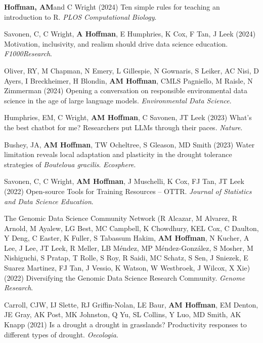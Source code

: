 \documentclass{cv}
\begin{document}
\begin{pubenum}
\item\textbf{Hoffman, AM}\footnotemark[1] and C Wright (2024) Ten simple rules for teaching an introduction to R. \textit{PLOS Computational Biology}. 

\item Savonen, C, C Wright, \textbf{A Hoffman}, E Humphries, K Cox, F Tan, J Leek (2024) Motivation, inclusivity, and realism should drive data science education. \textit{F1000Research}. 

\item Oliver, RY, M Chapman, N Emery, L Gillespie, N Gownaris, S Leiker, AC Nisi, D Ayers, I Breckheimer, H Blondin, \textbf{AM Hoffman}, CMLS Pagniello, M Raisle, N Zimmerman (2024) Opening a conversation on responsible environmental data science in the age of large language models. \textit{Environmental Data Science}. 

\item Humphries, EM, C Wright, \textbf{AM Hoffman}, C Savonen, JT Leek (2023) What's the best chatbot for me? Researchers put LLMs through their paces. \textit{Nature}. 

\item Bushey, JA, \textbf{AM Hoffman}, TW Ocheltree, S Gleason, MD Smith (2023) Water limitation reveals local adaptation and plasticity in the drought tolerance strategies of \textit{Bouteloua gracilis}. \textit{Ecosphere}. 

\item Savonen, C, C Wright, \textbf{AM Hoffman}, J Muschelli, K Cox, FJ Tan, JT Leek (2022) Open-source Tools for Training Resources -- OTTR. \textit{Journal of Statistics and Data Science Education}. 

\item The Genomic Data Science Community Network (R Alcazar, M Alvarez, R Arnold, M Ayalew, LG Best, MC Campbell, K Chowdhury, KEL Cox, C Daulton, Y Deng, C Easter, K Fuller, S Tabassum Hakim, \textbf{AM Hoffman}\footnotemark[1], N Kucher, A Lee, J Lee, JT Leek, R Meller, LB Méndez, MP Méndez-González, S Mosher, M Nishiguchi, S Pratap, T Rolle, S Roy, R Saidi, MC Schatz, S Sen, J Sniezek, E Suarez Martinez, FJ Tan, J Vessio, K Watson, W Westbroek, J Wilcox, X Xie) (2022) Diversifying the Genomic Data Science Research Community. \textit{Genome Research}. 

\item Carroll, CJW, IJ Slette, RJ Griffin-Nolan, LE Baur, \textbf{AM Hoffman}, EM Denton, JE Gray, AK Post, MK Johnston, Q Yu, SL Collins, Y Luo, MD Smith, AK Knapp (2021) Is a drought a drought in grasslands? Productivity responses to different types of drought. \textit{Oecologia}. 


\end{pubenum}
\end{document}
